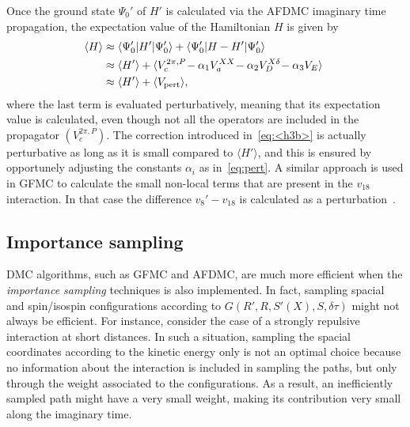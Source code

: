 \documentclass[aps,prc,twocolumn,superscriptaddress,floatfix]{revtex4-1}
\begin{document}
Once the ground state $\Psi_0'$ of $H'$ is calculated via the AFDMC imaginary
time propagation, the expectation value of the Hamiltonian $H$ is given by
\begin{align}
\!\!\langle H\rangle &\approx\langle\Psi_0'|H'|\Psi_0'\rangle+\langle\Psi_0'|H-H'|\Psi_0'\rangle \nonumber \\
& \approx\langle H'\rangle+\langle V_c^{2\pi,P}\!-\alpha_1V_a^{XX}\!-\alpha_2V_D^{X\delta}\!-\alpha_3V_E\rangle \nonumber \\
& \approx\langle H'\rangle+\langle V_{\rm pert}\rangle ,
\label{eq:<h3b>}
\end{align}
where the last term is evaluated perturbatively, meaning that its expectation
value is calculated, even though not all the operators are included in the propagator $(V_c^{2\pi,P})$.
The correction introduced in~\cref{eq:<h3b>} is actually perturbative as long as 
it is small compared to $\langle H'\rangle$, and this is ensured by opportunely adjusting 
the constants $\alpha_i$ as in~\cref{eq:pert}.
A similar approach is used in GFMC to calculate the small non-local terms that are 
present in the $v_{18}$ interaction. In that case the difference $v_8'-v_{18}$
is calculated as a perturbation~\cite{Pudliner:1997}.


\subsection{Importance sampling}
\label{sec:is}
DMC algorithms, such as GFMC and AFDMC, are much more efficient when the \emph{importance sampling}
techniques is also implemented.
In fact, sampling spacial and spin/isospin configurations according to $G(R',R,S'(X),S,\delta\tau)$ 
might not always be efficient. For instance, consider the case of a strongly repulsive interaction 
at short distances. In such a situation, sampling the spacial coordinates according to the kinetic 
energy only is not an optimal choice because no information about the interaction is included in 
sampling the paths, but only through the weight associated to the configurations. 
As a result, an inefficiently sampled path might have a very small weight, making its contribution 
very small along the imaginary time.
\end{document}
